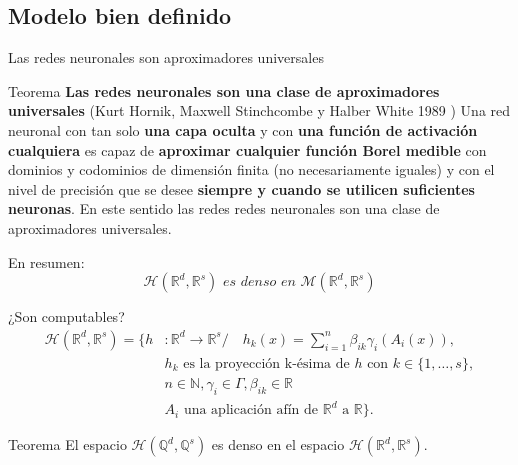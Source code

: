 \documentclass{beamer}
\newcommand{\R}{\mathbb{R}}
\newcommand{\N}{\mathbb{N}}
\newcommand{\Q}{\mathbb{Q}}
\newcommand{\rrnnmc}{ \mathcal{H}(\R^d,\R^s)}
\begin{document}
\subsection{Modelo bien definido}
\begin{frame}{Las redes neuronales son aproximadores universales}
    \begin{block}{Teorema  \textbf{Las redes neuronales son una clase de aproximadores universales}}
        (Kurt Hornik, Maxwell Stinchcombe y Halber White 1989 \cite{HORNIK1989359})
        Una red neuronal con tan solo \textbf{una capa oculta} y con \textbf{una función de activación cualquiera} es capaz de \textbf{aproximar cualquier 
        función Borel medible}  con dominios y codominios de dimensión finita (no necesariamente iguales) y con el nivel de precisión que se desee \textbf{siempre y cuando 
        se utilicen suficientes neuronas}. En este sentido las redes redes neuronales son una clase de aproximadores universales.
    \end{block}
    En resumen: 
    \begin{equation*}
        \mathcal{H}(\R^d,\R^s)  \textit{ es denso en } \mathcal{M}(\R^d,\R^s) 
    \end{equation*}
\end{frame}
\begin{frame}{¿Son computables?}
    \begin{align*}
        \mathcal{H}(\R^d,\R^s) 
            =
            \{
                h &: \R^d \longrightarrow \R^s 
                 /\quad 
                h_k(x) = 
                \sum_{i=1}^{n} \beta_{i k} \gamma_{i}( A_{i}(x)), \\
                & \text{$h_k$  es la proyección k-ésima de $h$ con 
                $k \in \{1, \ldots, s\}$}, \\
                & n \in \N,\gamma_{i} \in \Gamma , \beta_{i k} \in \R \\
                &A_{i} \text{ una aplicación afín de $\R^d$ a $\R$}           
            \}.
    \end{align*}
    \pause
    \begin{exampleblock}{Teorema}
        El espacio $\mathcal{H}(\Q^d, \Q^s)$ es denso en el espacio $\rrnnmc$. 
    \end{exampleblock}
\end{frame}
\end{document}
